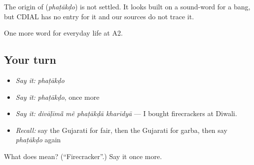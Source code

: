 \begin{cousinweb}
The origin of \textbf{} (\emph{phaṭākḍo}) is not settled. It looks built on a sound-word for a bang, but CDIAL has no entry for it and our sources do not trace it.
\end{cousinweb}

\begin{grammarlens}[title={What you've built}]
One more word for everyday life at A2.
\end{grammarlens}

\subsection*{Your turn}
\begin{itemize}
\raggedright
  \item \emph{Say it:} \emph{phaṭākḍo}
  \item \emph{Say it:} \emph{phaṭākḍo}, once more
  \item \emph{Say it:} \emph{divāḷīmā̃ mẽ phaṭākḍā kharīdyā} — I bought firecrackers at Diwali.
  \item \emph{Recall:} say the Gujarati for fair, then the Gujarati for garba, then say \emph{phaṭākḍo} again
\end{itemize}

\begin{tcolorbox}[breakable,colback=teal!4,colframe=teal!35!black,title={Before you move on}]
What does  mean? (\textquotedblleft{}Firecracker\textquotedblright{}.) Say it once more.
\end{tcolorbox}
